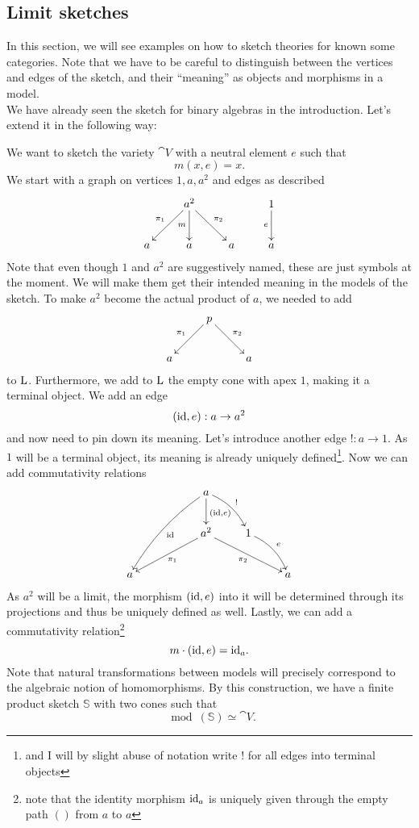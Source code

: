 \subsection{Limit sketches}

In this section, we will see examples on how to sketch theories for known some categories. Note that we have to be careful to distinguish between the vertices and edges of the sketch, and their ``meaning'' as objects and morphisms in a model. \\

We have already seen the sketch for binary algebras in the introduction. Let's extend it in the following way:

\begin{Example}\label{ex:unitality}
We want to sketch the variety $\cat V$ with a neutral element $e$ such that
\[ m(x, e) = x. \]
We start with a graph on vertices $1, a, a^2$ and edges as described
\[
\xymatrix{
  & a^2 \ar[rd]^{\pi_2} \ar[d]_{m} \ar[ld]_{\pi_1} & & 1 \ar[d]_{e} \\
a & a & a & a
}\]
Note that even though $1$ and $a^2$ are suggestively named, these are just symbols at the moment. We will make them get their intended meaning in the models of the sketch. To make $a^2$ become the actual product of $a$, we needed to add
\[
\xymatrix{
  & p \ar[rd]^{\pi_2} \ar[ld]_{\pi_1} & \\
a & & a
}\]
to $\textrm{L}$. Furthermore, we add to $\textrm{L}$ the empty cone with apex $1$, making it a terminal object. We add an edge
\[ (\textrm{id},e) : a \to a^2 \]
and now need to pin down its meaning. Let's introduce another edge $! : a \to 1$. As $1$ will be a terminal object, its meaning is already uniquely defined\footnote{and I will by slight abuse of notation write $!$ for all edges into terminal objects}. Now we can add commutativity relations
\[
\xymatrix{
  & & a \ar[d]^{(\id,e)} \ar@/_/[lldd]^{\id} \ar@/^/[rd]^{!}  & & \\
  & & a^2 \ar[lld]^{\pi_1} \ar[rrd]_{\pi_2} & 1 \ar@/^/[rd]^{e} & \\
a & & & & a
}\]
As $a^2$ will be a limit, the morphism $(\textrm{id},e)$ into it will be determined through its projections and thus be uniquely defined as well. Lastly, we can add a commutativity relation\footnote{note that the identity morphism $\textrm{id}_a$ is uniquely given through the empty path $()$ from $a$ to $a$}
\[ m \cdot (\textrm{id},e) = \textrm{id}_a. \]
Note that natural transformations between models will precisely correspond to the algebraic notion of homomorphisms. By this construction, we have a finite product sketch $\mathbb S$ with two cones such that
\[ \mod(\mathbb S) \simeq \cat V. \]
\end{Example}

